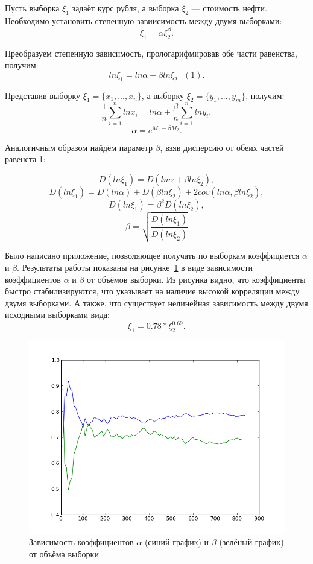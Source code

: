\documentclass[12pt,a4paper,oneside]{extarticle}
\begin{document}
    Пусть выборка $\xi_1$ задаёт курс рубля, а выборка $\xi_2$ --- стоимость нефти.
    Необходимо установить степенную завиисимость между двумя выборками: $$\xi_1=\alpha\xi_2^{\beta}.$$

    Преобразуем степенную зависимость, прологарифмировав обе части равенства, получим: $$ln \xi_1 = ln \alpha + \beta ln \xi_2~~~ (1).$$


       
    Представив выборку $\xi_1 = \{x_1, . . . , x_n\}$, а выборку $\xi_2 = \{y_1, . . . , y_m\}$, получим:
    $$\frac{1}{n}\sum_{i=1}^{n} ln x_i = ln \alpha + \frac{\beta}{n} \sum_{i=1}^{n} ln y_i,$$
    $$\alpha = e^{M_1-\beta M_2}.$$

    Аналогичным образом найдём параметр $\beta$, взяв дисперсию от обеих частей равенста 1:

    $$D (ln \xi_1) = D(ln \alpha + \beta ln \xi_2),$$
    $$D (ln \xi_1) = D(ln \alpha) + D(\beta ln \xi_2) + 2 cov(ln \alpha, \beta ln \xi_2),$$
    $$D (ln \xi_1) = \beta^2 D(ln \xi_2), $$
    $$\beta = \sqrt{\frac{D (ln \xi_1)}{D (ln \xi_2)}}$$

    Было написано приложение, позволяющее получать по выборкам коэффициется $\alpha$ и $\beta$. Результаты работы показаны на рисунке~\ref{pic:tree} в виде зависимости коэффициентов $\alpha$ и $\beta$ от объёмов выборки. Из рисунка видно, что коэффициенты быстро стабилизируются, что указывает на наличие высокой корреляции между двумя выборками. А также, что существует нелинейная зависимость между двумя исходными выборками вида: $$\xi_1 = 0.78*\xi_2^{0.69}.$$ 

    \begin{figure}[h!]
        \center
        \includegraphics[scale=0.7]{../model.png}
        \caption{Зависимость коэффициентов $\alpha$ (синий график) и $\beta$ (зелёный график) от объёма выборки}
        \label{pic:tree}
    \end{figure}
\end{document}
